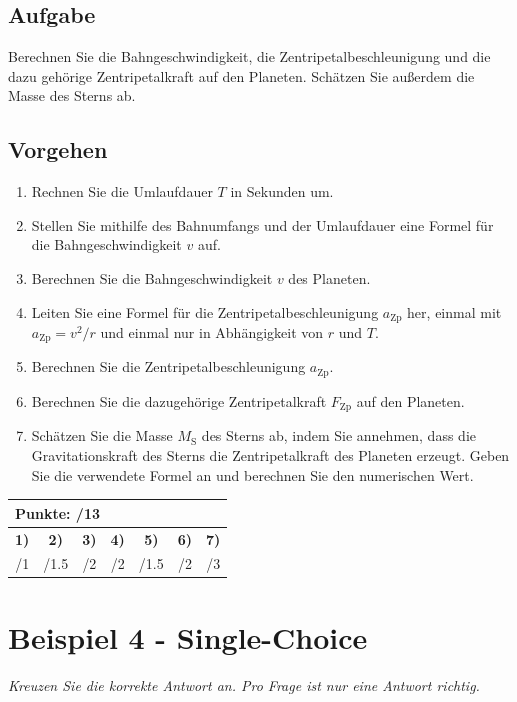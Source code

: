 \documentclass[11pt, a4paper]{article}
\begin{document}
\subsection*{Aufgabe}
Berechnen Sie die Bahngeschwindigkeit, die Zentripetalbeschleunigung und die dazu gehörige Zentripetalkraft auf den Planeten. Schätzen Sie außerdem die Masse des Sterns ab.

\subsection*{Vorgehen}
\begin{enumerate}
    \item Rechnen Sie die Umlaufdauer $T$ in Sekunden um.
    \item Stellen Sie mithilfe des Bahnumfangs und der Umlaufdauer eine Formel für die Bahngeschwindigkeit $v$ auf.
    \item Berechnen Sie die Bahngeschwindigkeit $v$ des Planeten.
    \item Leiten Sie eine Formel für die Zentripetalbeschleunigung $a_{\text{Zp}}$ her, einmal mit $a_{\text{Zp}} = v^2/r$ und einmal nur in Abhängigkeit von $r$ und $T$.
    \item Berechnen Sie die Zentripetalbeschleunigung $a_{\text{Zp}}$.
    \item Berechnen Sie die dazugehörige Zentripetalkraft $F_{\text{Zp}}$ auf den Planeten.
    \item Schätzen Sie die Masse $M_{\text{S}}$ des Sterns ab, indem Sie annehmen, dass die Gravitationskraft des Sterns die Zentripetalkraft des Planeten erzeugt. Geben Sie die verwendete Formel an und berechnen Sie den numerischen Wert.
\end{enumerate}

\vfill
\begin{flushright}
\renewcommand{\arraystretch}{1.23}
\begin{tabular}{|c | c | c | c | c | c | c|}
\hline
\multicolumn{7}{|l|}{\textbf{\large{Punkte: \quad\quad\quad /13}}}\\
\hline
\textbf{1)} & \textbf{2)} & \textbf{3)} & \textbf{4)} & \textbf{5)} & \textbf{6)} & \textbf{7)} \\
\quad/1 & \quad/1.5 & \quad/2 & \quad/2 & \quad/1.5 & \quad/2 & \quad/3 \\
\hline
\end{tabular}
\end{flushright}

\newpage

\section*{Beispiel 4 - Single-Choice}
\textit{Kreuzen Sie die korrekte Antwort an. Pro Frage ist nur eine Antwort richtig.}
\end{document}

